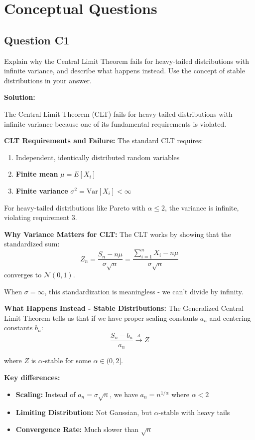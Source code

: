 \documentclass[11pt]{article}
\newenvironment{solution}
{\color{solutioncolor}\begin{framed}\textbf{Solution:}\par}
{\end{framed}}
\begin{document}
\section{Conceptual Questions}

\subsection{Question C1}
Explain why the Central Limit Theorem fails for heavy-tailed distributions with infinite variance, and describe what happens instead. Use the concept of stable distributions in your answer.

\begin{solution}
The Central Limit Theorem (CLT) fails for heavy-tailed distributions with infinite variance because one of its fundamental requirements is violated.

\textbf{CLT Requirements and Failure:}
The standard CLT requires:
\begin{enumerate}
\item Independent, identically distributed random variables
\item \textbf{Finite mean} $\mu = E[X_i]$
\item \textbf{Finite variance} $\sigma^2 = \text{Var}[X_i] < \infty$
\end{enumerate}

For heavy-tailed distributions like Pareto with $\alpha \leq 2$, the variance is infinite, violating requirement 3.

\textbf{Why Variance Matters for CLT:}
The CLT works by showing that the standardized sum:
$$Z_n = \frac{S_n - n\mu}{\sigma\sqrt{n}} = \frac{\sum_{i=1}^n X_i - n\mu}{\sigma\sqrt{n}}$$
converges to $\mathcal{N}(0,1)$.

When $\sigma = \infty$, this standardization is meaningless - we can't divide by infinity.

\textbf{What Happens Instead - Stable Distributions:}
The Generalized Central Limit Theorem tells us that if we have proper scaling constants $a_n$ and centering constants $b_n$:
$$\frac{S_n - b_n}{a_n} \xrightarrow{d} Z$$

where $Z$ is $\alpha$-stable for some $\alpha \in (0, 2]$.

\textbf{Key differences:}
\begin{itemize}
\item \textbf{Scaling:} Instead of $a_n = \sigma\sqrt{n}$, we have $a_n = n^{1/\alpha}$ where $\alpha < 2$
\item \textbf{Limiting Distribution:} Not Gaussian, but $\alpha$-stable with heavy tails
\item \textbf{Convergence Rate:} Much slower than $\sqrt{n}$
\end{itemize}


\end{solution}
\end{document}
